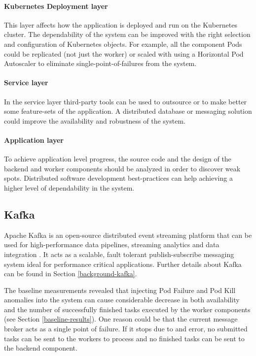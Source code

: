 \paragraph{Kubernetes Deployment layer} This layer affects how the application is deployed and run on the Kubernetes cluster. The dependability of the system can be improved with the right selection and configuration of Kubernetes objects. For example, all the component Pods could be replicated (not just the worker) or scaled with using a Horizontal Pod Autoscaler to eliminate single-point-of-failures from the system.

\paragraph{Service layer} In the service layer third-party tools can be used to outsource or to make better some feature-sets of the application. A distributed database or messaging solution could improve the availability and robustness of the system.

\paragraph{Application layer} To achieve application level progress, the source code and the design of the backend and worker components should be analyzed in order to discover weak spots. Distributed software development best-practices can help achieving a higher level of dependability in the system.

\subsection{Kafka}

Apache Kafka is an open-source distributed event streaming platform that can be used for high-performance data pipelines, streaming analytics and data integration \cite{Kafka}. It acts as a scalable, fault tolerant publish-subscribe messaging system ideal for performance critical applications. Further details about Kafka can be found in Section \ref{background-kafka}.

The baseline measurements revealed that injecting Pod Failure and Pod Kill anomalies into the system can cause considerable decrease in both availability and the number of successfully finished tasks executed by the worker components (see Section \ref{baseline-results}). One reason could be that the current message broker acts as a single point of failure. If it stops due to and error, no submitted tasks can be sent to the workers to process and no finished tasks can be sent to the backend component.

